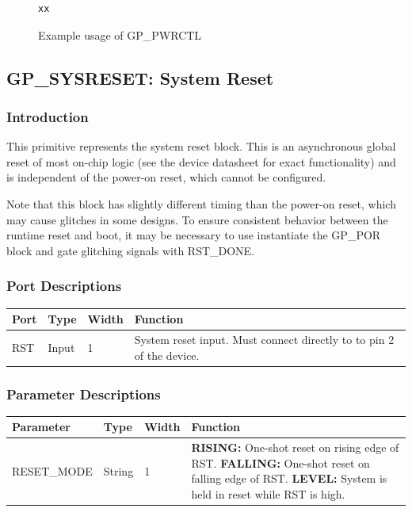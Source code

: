\documentclass{article}
\begin{document}
\begin{figure}[h]
\begin{lstlisting}
xx
\end{lstlisting}
\caption{Example usage of GP\_PWRCTL}
\label{gp-pwrctl-example}
\end{figure}


\pagebreak
\clearpage
\subsection{GP\_SYSRESET: System Reset}

\subsubsection{Introduction}
This primitive represents the system reset block. This is an asynchronous global reset of most on-chip logic (see the
device datasheet for exact functionality) and is independent of the power-on reset, which cannot be configured.

Note that this block has slightly different timing than the power-on reset, which may cause glitches in some designs. 
To ensure consistent behavior between the runtime reset and boot, it may be necessary to use instantiate the GP\_POR 
block and gate glitching signals with RST\_DONE.

\subsubsection{Port Descriptions}

\begin{tabularx}{5in}{|l|l|l|X|}
\hline
{\bfseries Port} & {\bfseries Type} & {\bfseries Width} & {\bfseries Function} \\
\hline
RST & Input & 1 & System reset input. Must connect directly to to pin 2 of the device.\\
\hline
\end{tabularx}

\subsubsection{Parameter Descriptions}

\begin{tabularx}{5in}{|l|l|l|X|}
\hline
{\bfseries Parameter} & {\bfseries Type} & {\bfseries Width} & {\bfseries Function} \\
\hline
RESET\_MODE & String & 1 & 
	{\bfseries RISING: } \newline One-shot reset on rising edge of RST. \newline
	{\bfseries FALLING: } \newline One-shot reset on falling edge of RST. \newline
	{\bfseries LEVEL: } \newline System is held in reset while RST is high.\\
\hline
\end{tabularx}
\end{document}
